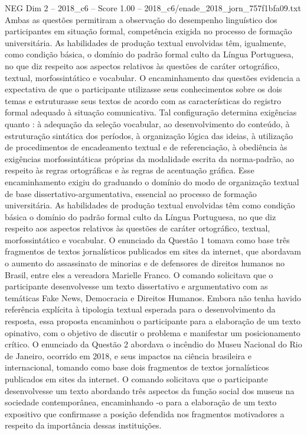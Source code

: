 \begin{textsample}{NEG Dim 2 – 2018\_c6 – Score 1.00 – 2018\_c6/enade\_2018\_jorn\_757f1bfa09.txt}
Ambas as questões permitiram a observação do desempenho linguístico dos participantes em situação formal, competência exigida no processo de formação universitária.
As habilidades de produção textual envolvidas têm, igualmente, como condição básica, o domínio do padrão formal culto da Língua Portuguesa, no que diz respeito aos aspectos relativos às questões de caráter ortográfico, textual, morfossintático e vocabular.
O encaminhamento das questões evidencia a expectativa de que o participante utilizasse seus conhecimentos sobre os dois temas e estruturasse seus textos de acordo com as características do registro formal adequado à situação comunicativa.
Tal configuração determina exigências quanto : à adequação da seleção vocabular, ao desenvolvimento do conteúdo, à estruturação sintática dos períodos, à organização lógica das ideias, à utilização de procedimentos de encadeamento textual e de referenciação, à obediência às exigências morfossintáticas próprias da modalidade escrita da norma-padrão, ao respeito às regras ortográficas e às regras de acentuação gráfica.
Esse encaminhamento exigiu do graduando o domínio do modo de organização textual de base dissertativo-argumentativa, essencial ao processo de formação universitária.
As habilidades de produção textual envolvidas têm como condição básica o domínio do padrão formal culto da Língua Portuguesa, no que diz respeito aos aspectos relativos às questões de caráter ortográfico, textual, morfossintático e vocabular.
O enunciado da Questão 1 tomava como base três fragmentos de textos jornalísticos publicados em sites da internet, que abordavam o aumento do assassinato de minorias e de defensores de direitos humanos no Brasil, entre eles a vereadora Marielle Franco.
O comando solicitava que o participante desenvolvesse um texto dissertativo e argumentativo com as temáticas Fake News, Democracia e Direitos Humanos.
Embora não tenha havido referência explícita à tipologia textual esperada para o desenvolvimento da resposta, essa proposta encaminhou o participante para a elaboração de um texto opinativo, com o objetivo de discutir o problema e manifestar um posicionamento crítico.
O enunciado da Questão 2 abordava o incêndio do Museu Nacional do Rio de Janeiro, ocorrido em 2018, e seus impactos na ciência brasileira e internacional, tomando como base dois fragmentos de textos jornalísticos publicados em sites da internet.
O comando solicitava que o participante desenvolvesse um texto abordando três aspectos da função social dos museus na sociedade contemporânea, encaminhando -o para a elaboração de um texto expositivo que confirmasse a posição defendida nos fragmentos motivadores a respeito da importância dessas instituições.

\end{textsample}

